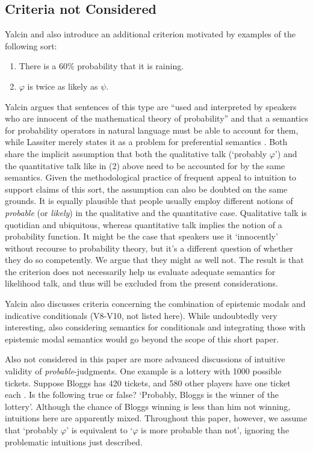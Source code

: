 \documentclass{article}
\theoremstyle{definition}
\begin{document}
\subsection{Criteria not Considered}
Yalcin and also \textcite{lassiter10_gradab} introduce an additional criterion motivated by examples of the following sort:
\begin{enumerate}[nosep]
  \item There is a 60\% probability that it is raining.
  \item $\varphi$ is twice as likely as $\psi$.
\end{enumerate}
Yalcin argues that sentences of this type are ``used and interpreted by speakers who are innocent of the mathematical theory of probability'' \parencite[][p.~923]{yalcin10_probab_operat} and that a semantics for probability operators in natural language must be able to account for them, while Lassiter merely states it as a problem for preferential semantics \parencite[][p.~210]{lassiter10_gradab}. Both share the implicit assumption that both the qualitative talk (`probably $\varphi$') and the quantitative talk like in (2) above need to be accounted for by the same semantics. Given the methodological practice of frequent appeal to intuition to support claims of this sort, the assumption can also be doubted on the same grounds. It is equally plausible that people usually employ different notions of \emph{probable} (or \emph{likely}) in the qualitative and the quantitative case. Qualitative talk is quotidian and ubiquitous, whereas quantitative talk implies the notion of a probability function. It might be the case that speakers use it `innocently' without recourse to probability theory, but it's a different question of whether they do so competently. We argue that they might as well not.
The result is that the criterion does not necessarily help us evaluate adequate semantics for likelihood talk, and thus will be excluded from the present considerations.

Yalcin also discusses criteria concerning the combination of epistemic modals and indicative conditionals (V8-V10, not listed here). While undoubtedly very interesting, also considering semantics for conditionals and integrating those with epistemic modal semantics would go beyond the scope of this short paper.

Also not considered in this paper are more advanced discussions of intuitive validity of \emph{probable}-judgments. One example is a lottery with 1000 possible tickets.
Suppose Bloggs has 420 tickets, and 580 other players have one ticket each \parencite[p.~931]{yalcin10_probab_operat}. Is the following true or false?
`Probably, Bloggs is the winner of the lottery'. Although the chance of Bloggs winning is less than him not winning, intuitions here are apparently mixed. Throughout this paper, however, we assume that `probably $\varphi$' is equivalent to `$\varphi$ is more probable than not', ignoring the problematic intuitions just described.
\end{document}
